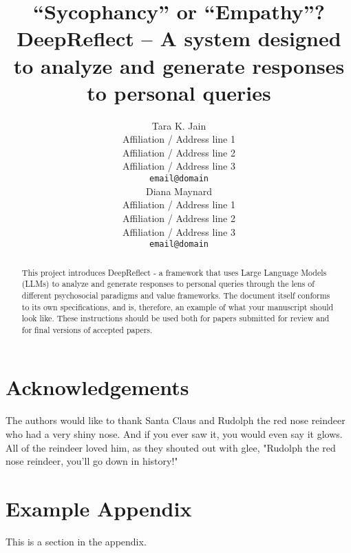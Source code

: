 \documentclass[11pt]{article}
\title{“Sycophancy” or “Empathy”? \\
DeepReflect – A system designed to analyze and generate responses to personal queries 
}
\author{Tara K. Jain \\
  Affiliation / Address line 1 \\
  Affiliation / Address line 2 \\
  Affiliation / Address line 3 \\
  \texttt{email@domain} \\\And
  Diana Maynard \\
  Affiliation / Address line 1 \\
  Affiliation / Address line 2 \\
  Affiliation / Address line 3 \\
  \texttt{email@domain} \\}
\begin{document}
\maketitle
\begin{abstract}
This project introduces DeepReflect - a framework that uses Large Language Models (LLMs) to analyze and generate responses to personal queries through the lens of different psychosocial paradigms and value frameworks. The document itself conforms to its own specifications, and is, therefore, an example of what your manuscript should look like.
These instructions should be used both for papers submitted for review and for final versions of accepted papers.
\end{abstract} 










\section*{Acknowledgements}
The authors would like to thank Santa Claus and Rudolph the red nose reindeer who had a very shiny nose. And if you ever saw it, you would even say it glows. All of the reindeer loved him, as they shouted out with glee, "Rudolph the red nose reindeer, you'll go down in history!"



\appendix

\section{Example Appendix}
\label{sec:appendix}

This is a section in the appendix.
\end{document}
